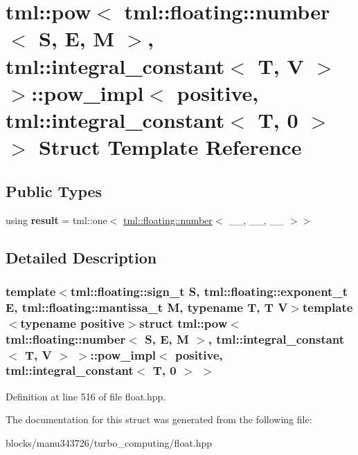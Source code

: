 \hypertarget{structtml_1_1pow_3_01tml_1_1floating_1_1number_3_01_s_00_01_e_00_01_m_01_4_00_01tml_1_1integral_19d77fbc5d11f0f5c967f26a9e50ca00}{\section{tml\+:\+:pow$<$ tml\+:\+:floating\+:\+:number$<$ S, E, M $>$, tml\+:\+:integral\+\_\+constant$<$ T, V $>$ $>$\+:\+:pow\+\_\+impl$<$ positive, tml\+:\+:integral\+\_\+constant$<$ T, 0 $>$ $>$ Struct Template Reference}
\label{structtml_1_1pow_3_01tml_1_1floating_1_1number_3_01_s_00_01_e_00_01_m_01_4_00_01tml_1_1integral_19d77fbc5d11f0f5c967f26a9e50ca00}
}
\subsection*{Public Types}
\begin{DoxyCompactItemize}
\item 
\hypertarget{structtml_1_1pow_3_01tml_1_1floating_1_1number_3_01_s_00_01_e_00_01_m_01_4_00_01tml_1_1integral_19d77fbc5d11f0f5c967f26a9e50ca00_a981063619bc64905e61589aa6b56fc07}{using {\bfseries result} = tml\+::one$<$ \hyperlink{structtml_1_1floating_1_1number}{tml\+::floating\+::number}$<$ \+\_\+\+\_\+, \+\_\+\+\_\+, \+\_\+\+\_\+ $>$$>$}\label{structtml_1_1pow_3_01tml_1_1floating_1_1number_3_01_s_00_01_e_00_01_m_01_4_00_01tml_1_1integral_19d77fbc5d11f0f5c967f26a9e50ca00_a981063619bc64905e61589aa6b56fc07}

\end{DoxyCompactItemize}


\subsection{Detailed Description}
\subsubsection*{template$<$tml\+::floating\+::sign\+\_\+t S, tml\+::floating\+::exponent\+\_\+t E, tml\+::floating\+::mantissa\+\_\+t M, typename T, T V$>$template$<$typename positive$>$struct tml\+::pow$<$ tml\+::floating\+::number$<$ S, E, M $>$, tml\+::integral\+\_\+constant$<$ T, V $>$ $>$\+::pow\+\_\+impl$<$ positive, tml\+::integral\+\_\+constant$<$ T, 0 $>$ $>$}



Definition at line 516 of file float.\+hpp.



The documentation for this struct was generated from the following file\+:\begin{DoxyCompactItemize}
\item 
blocks/manu343726/turbo\+\_\+computing/float.\+hpp\end{DoxyCompactItemize}
